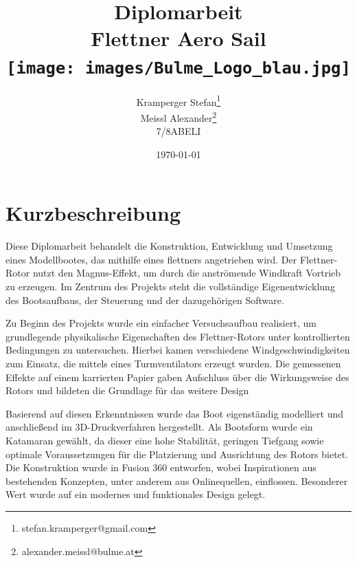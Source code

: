 \documentclass[a4paper,12pt]{article}
\begin{document}
\title{
  Diplomarbeit\\
  Flettner Aero Sail\\[1cm]
  \texttt{[image: images/Bulme\_Logo\_blau.jpg]}
}


\author{Kramperger Stefan\footnote{stefan.kramperger@gmail.com} \\ 
Meissl Alexander\footnote{alexander.meissl@bulme.at} \\
7/8ABELI}
\date{\today}
\maketitle
\newpage

\setcounter{page}{1}

\section*{Kurzbeschreibung}

Diese Diplomarbeit behandelt die Konstruktion, Entwicklung und Umsetzung eines Modellbootes, das mithilfe eines \gls{flettner}s angetrieben wird. Der Flettner-Rotor nutzt den Magnus-Effekt, um durch die anströmende Windkraft Vortrieb zu erzeugen. Im Zentrum des Projekts steht die vollständige Eigenentwicklung des Bootsaufbaus, der Steuerung und der dazugehörigen Software.\newline

Zu Beginn des Projekts wurde ein einfacher Versuchsaufbau realisiert, um grundlegende physikalische Eigenschaften des Flettner-Rotors unter kontrollierten Bedingungen zu untersuchen. Hierbei kamen verschiedene Windgeschwindigkeiten zum Einsatz, die mittels eines Turmventilators erzeugt wurden. Die gemessenen Effekte auf einem karrierten Papier gaben Aufschluss über die Wirkungsweise des Rotors und bildeten die Grundlage für das weitere Design\newline

Basierend auf diesen Erkenntnissen wurde das Boot eigenständig modelliert und anschließend im 3D-Druckverfahren hergestellt. Als Bootsform wurde ein Katamaran gewählt, da dieser eine hohe Stabilität, geringen Tiefgang sowie optimale Voraussetzungen für die Platzierung und Ausrichtung des Rotors bietet. Die Konstruktion wurde in Fusion 360 entworfen, wobei Inspirationen aus bestehenden Konzepten, unter anderem aus Onlinequellen, einflossen. Besonderer Wert wurde auf ein modernes und funktionales Design gelegt.
\end{document}
